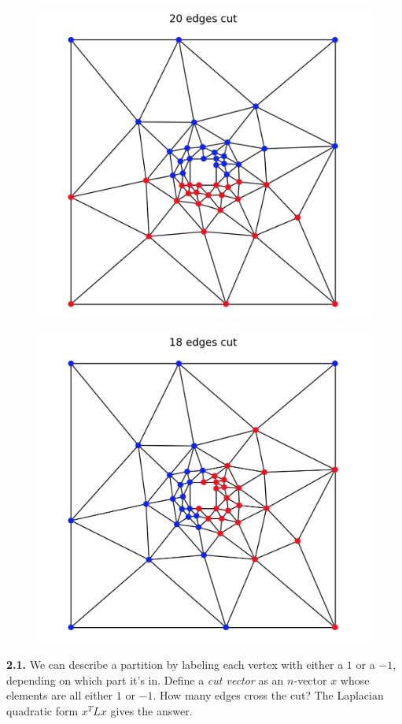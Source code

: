 \documentclass[11pt]{article}
\begin{document}
\begin{figure}[b]
\centering
\begin{minipage}{.5\textwidth}
  \centering
  \includegraphics[width=.65\linewidth]{geometric20}
  \label{fig:geometric}
\end{minipage}%
\begin{minipage}{.5\textwidth}
  \centering
  \includegraphics[width=.65\linewidth]{spectral18}
  \label{fig:spectral}
\end{minipage}
\end{figure}

\par\medskip
{\bf 2.1.}
We can describe a partition by labeling each vertex with either a $1$ or a $-1$, 
depending on which part it's in.
Define a {\em cut vector} as an $n$-vector $x$ whose elements are all either $1$ or $-1$.
How many edges cross the cut?
The Laplacian quadratic form $x^TLx$ gives the answer.
\end{document}
